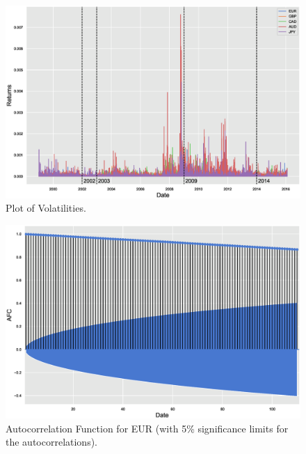 	\begin{figure}[!ht]
	\centering
	\includegraphics[width=\textwidth]{chapters/chapter_mvts/figures/pvolat.eps}
	\caption{Plot of Volatilities. \label{fig:pvolat}}
	\end{figure}

	\begin{figure}[!ht]
	\centering
	\includegraphics[width=\textwidth]{chapters/chapter_mvts/figures/pautofun.eps}
	\caption{Autocorrelation Function for EUR (with 5\% significance limits for the autocorrelations). \label{fig:pautofun}}
	\end{figure}

